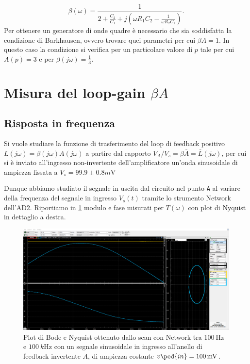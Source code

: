 \documentclass[10pt, a4paper, italian]{article}
\begin{document}
\begin{equation}\label{eq: beta}
\beta(\omega) = \frac{1}{2 + \frac{C_2}{C_1} +j\left(\omega R_1 C_2 -\frac{1}{\omega R_2C_1}\right)}.
\end{equation}
Per ottenere un generatore di onde quadre è necessario che sia soddisfatta la condizione di Barkhausen, ovvero trovare quei parametri per cui $\beta A = 1$. In questo caso la condizione si verifica per un particolare valore di  $p$ tale per cui $A(p) = 3$ e per $\beta(j\omega) = \frac13$.


\section{Misura del loop-gain $\beta A$}

\subsection{Risposta in frequenza}
Si vuole studiare la funzione di trasferimento del loop di feedback positivo
$L(j\omega) = \beta(j\omega) A(j\omega)$ a partire dal rapporto
$V_A/V_s = \beta \bar{A} = \bar{L}(j\omega)$, per cui si è
inviato all'ingresso non-invertente dell'amplificatore un'onda sinusoidale
di ampiezza fissata a $V_s = 99.9 \pm 0.8 \si{m\V}$

Dunque abbiamo studiato il segnale in uscita dal circuito nel punto \verb+A+
al variare della frequenza del segnale in ingresso $V_s (t)$ tramite lo
strumento Network dell'AD2. Riportiamo in \cref{fig: loopbode} modulo e fase
misurati per $T(\omega)$ con plot di Nyquist in dettaglio a destra.
\begin{figure}[htbp]
    \centering
	\includegraphics[scale=0.335]{Aloop100Hz}
    \caption{Plot di Bode e Nyquist ottenuto dallo scan con Network tra
    $\SI{100}{\Hz}$ e $\SI{100}{k\Hz}$ con un segnale sinusoidale in ingresso
    all'anello di feedback invertente $A$, di ampiezza costante
    $v\ped{in} = \SI{100}{m\V}$. \label{fig: loopbode}}
\end{figure}
\end{document}
